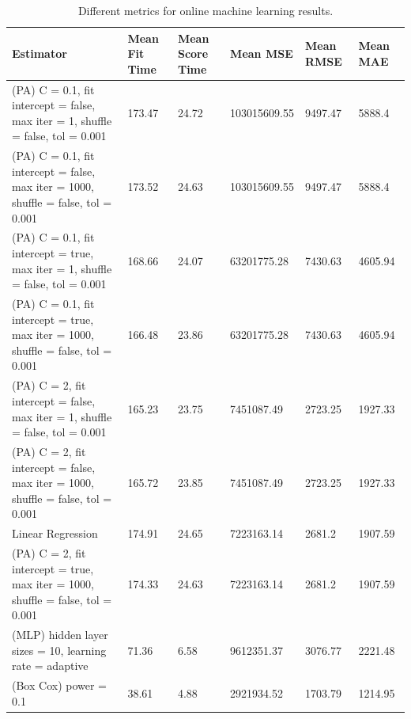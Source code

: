 \documentclass[final,3p,times,twocolumn,numbers]{elsarticle}
\begin{document}
\begin{table}[]
	\footnotesize
	\begin{tabular}{p{6.5cm}lllll@{}}
		\toprule
		Estimator                                                                          & Mean Fit Time & Mean Score Time & Mean MSE     & Mean RMSE & Mean MAE \\ \midrule
		(PA) C = 0.1, fit intercept = false, max iter = 1, shuffle = false, tol = 0.001    & 173.47        & 24.72           & 103015609.55 & 9497.47   & 5888.4   \\
		(PA) C = 0.1, fit intercept = false, max iter = 1000, shuffle = false, tol = 0.001 & 173.52        & 24.63           & 103015609.55 & 9497.47   & 5888.4   \\
		(PA) C = 0.1, fit intercept = true, max iter = 1, shuffle = false, tol = 0.001     & 168.66        & 24.07           & 63201775.28  & 7430.63   & 4605.94  \\
		(PA) C = 0.1, fit intercept = true, max iter = 1000, shuffle = false, tol = 0.001  & 166.48        & 23.86           & 63201775.28  & 7430.63   & 4605.94  \\
		(PA) C = 2, fit intercept = false, max iter = 1, shuffle = false, tol = 0.001      & 165.23        & 23.75           & 7451087.49   & 2723.25   & 1927.33  \\
		(PA) C = 2, fit intercept = false, max iter = 1000, shuffle = false, tol = 0.001   & 165.72        & 23.85           & 7451087.49   & 2723.25   & 1927.33  \\
		Linear Regression                                                                  & 174.91        & 24.65           & 7223163.14   & 2681.2    & 1907.59  \\
		(PA) C = 2, fit intercept = true, max iter = 1000, shuffle = false, tol = 0.001    & 174.33        & 24.63           & 7223163.14   & 2681.2    & 1907.59  \\
		(MLP) hidden layer sizes = 10, learning rate = adaptive                                  & 71.36         & 6.58            & 9612351.37   & 3076.77   & 2221.48  \\
		(Box Cox) power = 0.1                                                              & 38.61         & 4.88            & 2921934.52   & 1703.79   & 1214.95  \\\bottomrule
	\end{tabular}
	\caption{Different metrics for online machine learning results.}
	\label{table:online_ml_metrics}
\end{table}
\end{document}
